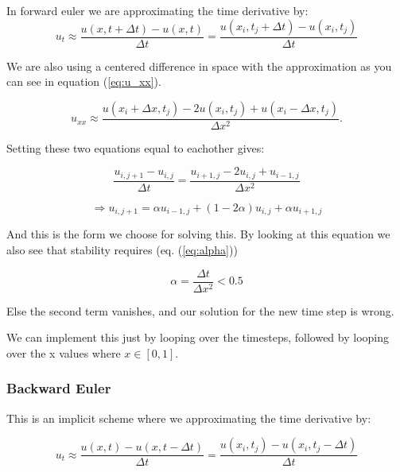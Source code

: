 \documentclass[a4paper,10pt]{article}
\begin{document}
In forward euler we are approximating the time derivative by:
\begin{equation}
u_t\approx \frac{u(x,t+\Delta t)-u(x,t)}{\Delta t}=\frac{u(x_i,t_j+\Delta t)-u(x_i,t_j)}{\Delta t}
\label{eq:forward_euler}
\end{equation}

We are also using a centered difference in space with the approximation as you can see in equation (\ref{eq:u_xx}). 

\begin{equation}
u_{xx}\approx \frac{u(x_i+\Delta x,t_j)-2u(x_i,t_j)+u(x_i-\Delta x,t_j)}{\Delta x^2}.
\label{eq:u_xx}
\end{equation}

Setting these two equations equal to eachother gives:
 
\begin{equation}
\frac{u_{i,j+1} - u_{i,j}}{\Delta t} = \frac{u_{i+1,j} - 2u_{i,j} + u_{i-1,j}}{\Delta x^2} 
\end{equation}

\begin{equation}
 \Rightarrow u_{i,j+1} = \alpha u_{i-1,j} + (1 -2\alpha)u_{i,j} + \alpha u_{i+1,j}
 \label{eq:Forward_eulerScheme}
\end{equation}

And this is the form we choose for solving this. By looking at this equation we also see that stability requires (eq. (\ref{eq:alpha}))

\begin{equation}
\alpha = \frac{\Delta t}{\Delta x^2} < 0.5
\label{eq:alpha}
\end{equation}

Else the second term vanishes, and our solution for the new time step is wrong.

We can implement this just by looping over the timesteps, followed by looping over the 
x values where $x \in [0,1]$.

\subsubsection{Backward Euler}

This is an implicit scheme where we approximating the time derivative by:

\begin{equation}
u_t\approx \frac{u(x,t)-u(x,t-\Delta t)}{\Delta t}=\frac{u(x_i,t_j)-u(x_i,t_j-\Delta t)}{\Delta t}
\label{eq:bacward_Euler}
\end{equation}
\end{document}
